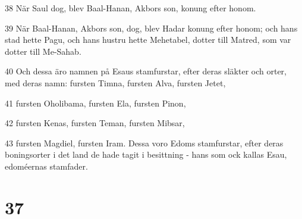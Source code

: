 \par 38 När Saul dog, blev Baal-Hanan, Akbors son, konung efter honom.
\par 39 När Baal-Hanan, Akbors son, dog, blev Hadar konung efter honom; och hans stad hette Pagu, och hans hustru hette Mehetabel, dotter till Matred, som var dotter till Me-Sahab.
\par 40 Och dessa äro namnen på Esaus stamfurstar, efter deras släkter och orter, med deras namn: fursten Timna, fursten Alva, fursten Jetet,
\par 41 fursten Oholibama, fursten Ela, fursten Pinon,
\par 42 fursten Kenas, fursten Teman, fursten Mibsar,
\par 43 fursten Magdiel, fursten Iram. Dessa voro Edoms stamfurstar, efter deras boningsorter i det land de hade tagit i besittning - hans som ock kallas Esau, edoméernas stamfader.

\chapter{37}

